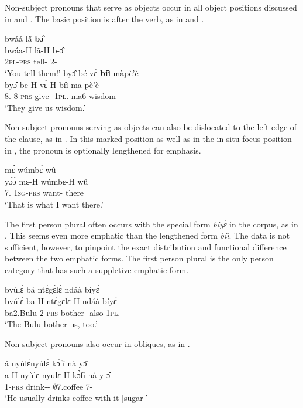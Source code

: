  Non-subject pronouns that serve as objects occur in all object positions discussed in  and .  The basic position is after the verb, as in  and .

\ea \label{NSBJ1x}
  \glll  bwáá lã́ {\bfseries bɔ̂}  \\
         bwáa-H lã-H b-ɔ̂ \\
            2\textsc{pl}-\textsc{prs} tell-{\R} 2-{\OBJ}     \\
    \trans `You tell them!'
\ex \label{NSBJ3}
  \glll byɔ̂ bé vɛ́ {\bfseries bíì} màpè'è \\
        byɔ̂ be-H vɛ̀-H bíì ma-pè'è \\
        8.{\OBJ} 8-\textsc{prs} give-{\R} 1\textsc{pl}.{\OBJ} ma6-wisdom  \\
    \trans `They give us wisdom.'
\z

Non-subject pronouns serving as objects can also be dislocated to the left edge of the clause, as in .  In this marked position  as well as in the in-situ focus position in , the pronoun is optionally lengthened for emphasis.

\ea \label{NSBJ1}
   mɛ́ wúmbɛ́ wû \\
        yɔ́ɔ̀ mɛ-H wúmbɛ-H wû \\
         7.{\OBJ} 1\textsc{sg}-\textsc{prs} want-{\R} there \\
    \trans `That is what I want there.'
\z

The first person plural often occurs with the special form {\itshape bíyɛ̀} in the corpus, as in . This seems even more emphatic than the lengthened form {\itshape bíì}. The data is not sufficient, however, to pinpoint the exact distribution and functional difference between the two emphatic forms. The first person plural is the only person category that has such a suppletive emphatic form.

\ea \label{NSBJ2}
  \glll bvúlɛ̀ bá ntɛ́gɛ́lɛ́ ndáà bíyɛ̀ \\
       bvúlɛ̀ ba-H ntɛ́gɛlɛ-H ndáà bíyɛ̀ \\
         ba2.Bulu 2-\textsc{prs} bother-{\R} also 1\textsc{pl}.{\OBJ}   \\
    \trans `The Bulu bother us, too.'
\z

\noindent Non-subject pronouns also occur in obliques, as in .

\ea \label{NSBJ2x}
  \glll á nyùlɛ́nyúlɛ́  kɔ̀fí nà yɔ̂ \\
       a-H nyùlɛ-nyulɛ-H  kɔ̀fí nà y-ɔ̂  \\
         1-\textsc{prs} drink-{\HAB}-{\R} $\emptyset$7.coffee {\COM} 7-{\OBJ}   \\
    \trans `He usually drinks coffee with it [sugar]'
\z

